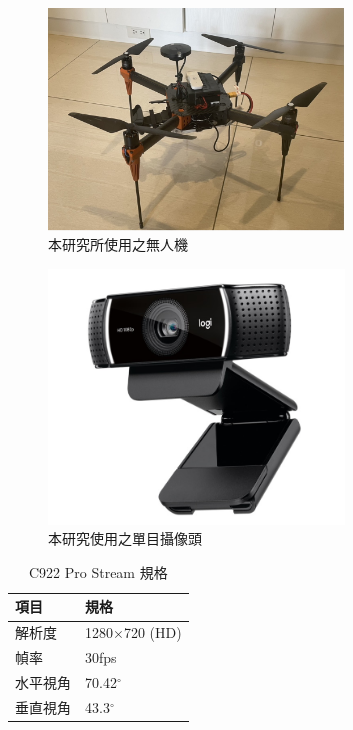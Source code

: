 \documentclass[12pt]{article}       %
\begin{document}
\begin{figure}[H]
    \centering
    \includegraphics[width=0.7\textwidth]{UAVphoto.jpg}     %
    \caption{本研究所使用之無人機}    %
    \label{fig:UAVphoto}    %
\end{figure}

\begin{figure}[H]
    \centering
    \includegraphics[width=0.7\textwidth]{c922.jpg}     %
    \caption{本研究使用之單目攝像頭\cite{logitech}}    %
    \label{fig:c922}    %
\end{figure}

\begin{table}[H]
    \centering
    \caption{C922 Pro Stream 規格}
    \vspace{6pt} %
    \label{tab:C922 Pro}
    \begin{tabular}{ll}
        \toprule
        \textbf{項目} & \textbf{規格} \\
        \midrule
        解析度  & 1280$\times$720 (HD) \\
        幀率  & 30fps \\
        水平視角 & 70.42$^\circ$ \\
        垂直視角  & 43.3$^\circ$ \\
        \bottomrule
    \end{tabular}
\end{table}
\end{document}
